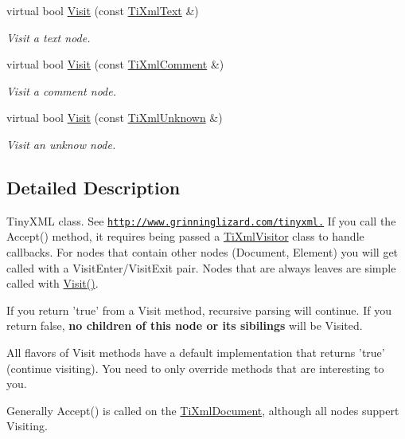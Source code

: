 \begin{DoxyCompactItemize}
virtual bool \hyperlink{class_ti_xml_visitor_a399b8ebca5cd14664974a32d2ce029e5}{Visit} (const \hyperlink{class_ti_xml_text}{TiXmlText} \&)
\begin{DoxyCompactList}\small\item\em Visit a text node. \item\end{DoxyCompactList}\item 
virtual bool \hyperlink{class_ti_xml_visitor_a53a60e7a528627b31af3161972cc7fa2}{Visit} (const \hyperlink{class_ti_xml_comment}{TiXmlComment} \&)
\begin{DoxyCompactList}\small\item\em Visit a comment node. \item\end{DoxyCompactList}\item 
virtual bool \hyperlink{class_ti_xml_visitor_a7e284d607d275c51dac1adb58159ce28}{Visit} (const \hyperlink{class_ti_xml_unknown}{TiXmlUnknown} \&)
\begin{DoxyCompactList}\small\item\em Visit an unknow node. \item\end{DoxyCompactList}\end{DoxyCompactItemize}


\subsection{Detailed Description}
TinyXML class. See \href{http://www.grinninglizard.com/tinyxml.}{\tt http://www.grinninglizard.com/tinyxml.} If you call the Accept() method, it requires being passed a \hyperlink{class_ti_xml_visitor}{TiXmlVisitor} class to handle callbacks. For nodes that contain other nodes (Document, Element) you will get called with a VisitEnter/VisitExit pair. Nodes that are always leaves are simple called with \hyperlink{class_ti_xml_visitor_afad71c71ce6473fb9b4b64cd92de4a19}{Visit()}.

If you return 'true' from a Visit method, recursive parsing will continue. If you return false, {\bfseries no children of this node or its sibilings} will be Visited.

All flavors of Visit methods have a default implementation that returns 'true' (continue visiting). You need to only override methods that are interesting to you.

Generally Accept() is called on the \hyperlink{class_ti_xml_document}{TiXmlDocument}, although all nodes suppert Visiting.

